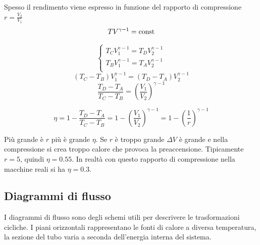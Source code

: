 Spesso il rendimento viene espresso in funzione del rapporto di compressione $r=\frac{V_2}{V_1}$
$$TV^{\gamma-1}=\text{const}$$

$$\left\{
\begin{array}{l}
T_CV_1^{\gamma-1}=T_DV_2^{\gamma-1}\\
T_BV_1^{\gamma-1}=T_AV_2^{\gamma-1}\\
\end{array}\right.$$
$$(T_C-T_B)V_1^{\gamma-1}=(T_D-T_A)V_2^{\gamma-1}$$
$$\frac{T_D-T_A}{T_C-T_B}=\left(\frac{V_1}{V_2}\right)^{\gamma-1}$$

$$\eta=1-\frac{T_D-T_A}{T_C-T_B}=1-\left(\frac{V_1}{V_2}\right)^{\gamma-1}\!\!\!\!\!\!\!\!\! =1-\left(\frac{1}{r}\right)^{\gamma-1}$$

Più grande è $r$ più è grande $\eta$. Se $r$ è troppo grande $\Delta V$ è grande e nella compressione si crea troppo calore che provoca la preaccensione. Tipicamente $r=5$, quindi $\eta=0.55$. In realtà con questo rapporto di compressione nella macchine reali si ha $\eta=0.3$.

\subsection{Diagrammi di flusso}
I diagrammi di flusso sono degli schemi utili per descrivere le trasformazioni cicliche. I piani orizzontali rappresentano le fonti di calore a diversa temperatura, la sezione del tubo varia a seconda dell'energia interna del sistema.

